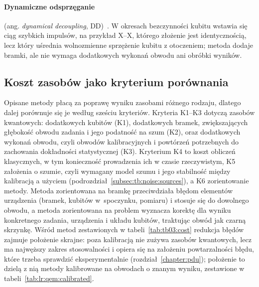 \paragraph{Dynamiczne odsprzęganie} (ang. \emph{dynamical decoupling}, DD)~\cite{viola_dynamical_1999,ezzell_dynamical_2023}.
W okresach bezczynności kubitu wstawia się ciąg szybkich impulsów, na przykład $\mathrm{X}$--$\mathrm{X}$, którego złożenie jest identycznością, lecz który uśrednia wolnozmienne sprzężenie kubitu z otoczeniem; metoda dodaje bramki, ale nie wymaga dodatkowych wykonań obwodu ani obróbki wyników.

\subsection{Koszt zasobów jako kryterium porównania}\label{subsec:tb:qec:cost}

Opisane metody płacą za poprawę wyniku zasobami różnego rodzaju, dlatego dalej porównuje się je według sześciu kryteriów.
Kryteria K1--K3 dotyczą zasobów kwantowych: dodatkowych kubitów (K1), dodatkowych bramek, zwiększających głębokość obwodu zadania i jego podatność na szum (K2), oraz dodatkowych wykonań obwodu, czyli obwodów kalibracyjnych i powtórzeń potrzebnych do zachowania dokładności statystycznej (K3).
Kryterium K4 to koszt obliczeń klasycznych, w tym konieczność prowadzenia ich w czasie rzeczywistym, K5 założenia o szumie, czyli wymagany model szumu i jego stabilność między kalibracją a użyciem (podrozdział~\ref{subsec:tb:noise:sources}), a K6 zorientowanie metody.
Metoda zorientowana na bramkę przeciwdziała błędom elementów urządzenia (bramek, kubitów w~spoczynku, pomiaru) i stosuje się do dowolnego obwodu, a metoda zorientowana na problem wyznacza korektę dla wyniku konkretnego zadania, urządzenia i układu kubitów, traktując obwód jak czarną skrzynkę.
Wśród metod zestawionych w tabeli~\ref{tab:tb03:cost} redukcja błędów zajmuje położenie skrajne: poza kalibracją nie zużywa zasobów kwantowych, lecz ma najwęższy zakres stosowalności i opiera się na założeniu powtarzalności błędu, które trzeba sprawdzić eksperymentalnie (rozdział~\ref{chapter:pdu}); położenie to dzielą z nią metody kalibrowane na obwodach o znanym wyniku, zestawione w tabeli~\ref{tab:lr:qem:calibrated}.

